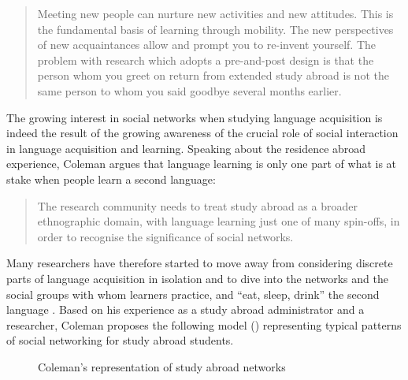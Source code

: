 \documentclass[output=paper]{langscibook}
\begin{document}
\begin{quote}
Meeting new people can nurture new activities and new attitudes. This is the fundamental basis of learning through mobility. The new perspectives of new acquaintances allow and prompt you to re-invent yourself. The problem with research which adopts a pre-and-post design is that the person whom you greet on return from extended study abroad is not the same person to whom you said goodbye several months earlier.\hbox{}\hfill\hbox{\citep[42]{Coleman2015}}
\end{quote}

The growing interest in social networks when studying language acquisition is indeed the result of the growing awareness of the crucial role of social interaction in language acquisition and learning. Speaking about the residence abroad experience, Coleman argues that language learning is only one part of what is at stake when people learn a second language:

\begin{quote}
The research community needs to treat study abroad as a broader ethnographic domain, with language learning just one of many spin-offs, in order to recognise the significance of social networks.\hbox{}\hfill\hbox{\citep[35]{Coleman2015}}
\end{quote}

Many researchers have therefore started to move away from considering discrete parts of language acquisition in isolation and to dive into the networks and the social groups with whom learners practice, and “eat, sleep, drink” the second language \citep[34]{Coleman2015}. Based on his experience as a study abroad administrator and a researcher, Coleman proposes the following model () representing typical patterns of social networking for study abroad students.


\begin{figure}
\caption{Coleman’s representation of study abroad networks \citep[44]{Coleman2015}\label{fig:saddour:1}}
\end{figure}
\end{document}
